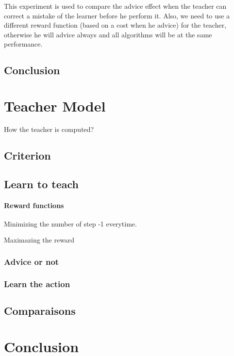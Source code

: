 \documentclass[a4paper,12pt]{article}
\begin{document}
      This experiment is used to compare the advice effect when the teacher can correct a mistake of the 
      learner before he perform it.
      Also, we need to use a different reward function (based on a cost when he advice) for the teacher, 
      otherwise he will advice always and all algorithms will be at the same performance.
      
      \subsection{Conclusion}
      
      \section{Teacher Model}
      
      How the teacher is computed?
      
      \subsection{Criterion}
      
      \subsection{Learn to teach}
      
      \paragraph{Reward functions}
      
      Minimizing the number of step -1 everytime.
      
      Maximazing the reward
      
      \subsubsection{Advice or not}
      
      \subsubsection{Learn the action}
     
      
      \subsection{Comparaisons}
      
      
      \section{Conclusion}
      
\end{document}
